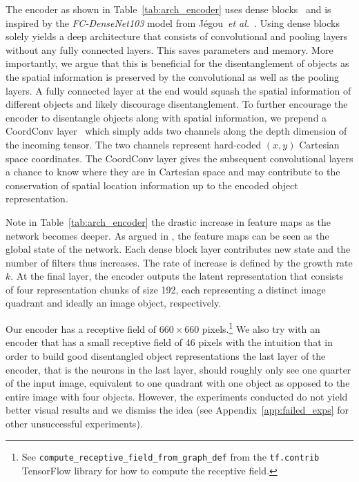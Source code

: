 \documentclass[a4paper,12pt]{report}
\begin{document}
The encoder as shown in Table~\ref{tab:arch_encoder} uses dense blocks~\cite{DenseNet} and is inspired by the \textit{FC-DenseNet103} model from Jégou~\textit{et al.}~\cite{Tiramisu}. Using dense blocks solely yields a deep architecture that consists of convolutional and pooling layers without any fully connected layers. This saves parameters and memory. More importantly, we argue that this is beneficial for the disentanglement of objects as the spatial information is preserved by the convolutional as well as the pooling layers. A fully connected layer at the end would squash the spatial information of different objects and likely discourage disentanglement. To further encourage the encoder to disentangle objects along with spatial information, we prepend a CoordConv layer~\cite{CoordConv} which simply adds two channels along the depth dimension of the incoming tensor. The two channels represent hard-coded $(x,y)$ Cartesian space coordinates. The CoordConv layer gives the subsequent convolutional layers a chance to know where they are in Cartesian space and may contribute to the conservation of spatial location information up to the encoded object representation. 

Note in Table~\ref{tab:arch_encoder} the drastic increase in feature maps as the network becomes deeper. As argued in \cite{DenseNet}, the feature maps can be seen as the global state of the network. Each dense block layer contributes new state and the number of filters thus increases. The rate of increase is defined by the growth rate $k$. At the final layer, the encoder outputs the latent representation that consists of four representation chunks of size 192, each representing a distinct image quadrant and ideally an image object, respectively.

Our encoder has a receptive field of $660 \times 660$ pixels.\footnote{See \texttt{compute\_receptive\_field\_from\_graph\_def} from the \texttt{tf.contrib} TensorFlow library for how to compute the receptive field.} We also try with an encoder that has a small receptive field of 46 pixels with the intuition that in order to build good disentangled object representations the last layer of the encoder, that is the neurons in the last layer, should roughly only see one quarter of the input image, equivalent to one quadrant with one object as opposed to the entire image with four objects. However, the experiments conducted do not yield better visual results and we dismiss the idea (see Appendix~\ref{app:failed_exps} for other unsuccessful experiments).
\end{document}
